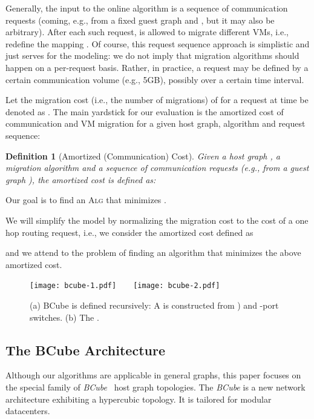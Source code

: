 \documentclass[conference]{IEEEtran}
\newtheorem{definition}{Definition}
\newcommand{\DCost}{\text{\sc Cost}}
\begin{document}
Generally, the input to the online algorithm  is a sequence  of communication requests  (coming, e.g., from a fixed guest graph  and , but it may also be arbitrary). After each such request,  is allowed to migrate different VMs, i.e., redefine the mapping .
Of course, this request sequence approach is simplistic and just serves for the modeling: we do not imply that migration algorithms should happen on a per-request basis. Rather, in practice, a request may be defined by a certain communication volume (e.g., 5GB), possibly over a certain time interval.

Let the migration cost (i.e., the number of migrations) of  for a request  at time  be denoted as . The main yardstick for our evaluation is the amortized cost of communication and VM migration for a given host graph, algorithm and request sequence:

\begin{definition}[Amortized (Communication) Cost]\label{def:AmortizeCost}
Given a host graph , a migration algorithm  and a sequence of communication requests  (e.g., from a guest graph ), the \emph{amortized cost} is defined as:

\end{definition}
Our goal is to find an \textsc{Alg} that minimizes \DCost.

We will simplify the model by normalizing the migration cost to the cost of a one hop routing request, i.e., we consider the amortized cost defined as
  
and we attend to the problem of finding an algorithm that minimizes the above amortized cost.


\begin{figure}[h]
				\centering
				\texttt{[image: bcube-1.pdf]}~~~~\texttt{[image: bcube-2.pdf]}\\
				\caption{(a) BCube is defined recursively: A  is constructed from  ) and  -port switches. (b) The .}
				\label{fig:bcube}
				\end{figure}

\subsection{The BCube Architecture}
\label{sec:Bcube}

Although our algorithms are applicable in general graphs, this paper focuses on the special family of \emph{BCube}~\cite{bcube2009} host graph topologies.
The \emph{BCube} is a new network architecture exhibiting a hypercubic topology. It is tailored for modular datacenters.
\end{document}
